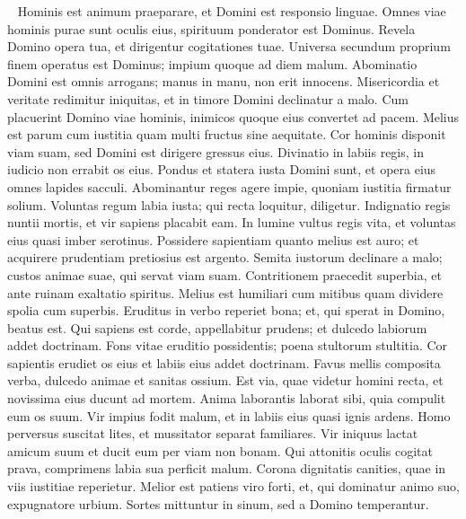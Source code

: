 \begin{biblechapter}   
\verse Hominis est animum praeparare, et Domini est responsio linguae. 
\verse Omnes viae hominis purae sunt oculis eius, spirituum ponderator est Dominus. 
\verse Revela Domino opera tua, et dirigentur cogitationes tuae. 
\verse Universa secundum proprium finem operatus est Dominus; impium quoque ad diem malum. 
\verse Abominatio Domini est omnis arrogans; manus in manu, non erit innocens. 
\verse Misericordia et veritate redimitur iniquitas, et in timore Domini declinatur a malo. 
\verse Cum placuerint Domino viae hominis, inimicos quoque eius convertet ad pacem. 
\verse Melius est parum cum iustitia quam multi fructus sine aequitate. 
\verse Cor hominis disponit viam suam, sed Domini est dirigere gressus eius. 
\verse Divinatio in labiis regis, in iudicio non errabit os eius. 
\verse Pondus et statera iusta Domini sunt, et opera eius omnes lapides sacculi. 
\verse Abominantur reges agere impie, quoniam iustitia firmatur solium. 
\verse Voluntas regum labia iusta; qui recta loquitur, diligetur. 
\verse Indignatio regis nuntii mortis, et vir sapiens placabit eam. 
\verse In lumine vultus regis vita, et voluntas eius quasi imber serotinus. 
\verse Possidere sapientiam quanto melius est auro; et acquirere prudentiam pretiosius est argento. 
\verse Semita iustorum declinare a malo; custos animae suae, qui servat viam suam. 
\verse Contritionem praecedit superbia, et ante ruinam exaltatio spiritus. 
\verse Melius est humiliari cum mitibus quam dividere spolia cum superbis. 
\verse Eruditus in verbo reperiet bona; et, qui sperat in Domino, beatus est. 
\verse Qui sapiens est corde, appellabitur prudens; et dulcedo labiorum addet doctrinam. 
\verse Fons vitae eruditio possidentis; poena stultorum stultitia. 
\verse Cor sapientis erudiet os eius et labiis eius addet doctrinam. 
\verse Favus mellis composita verba, dulcedo animae et sanitas ossium. 
\verse Est via, quae videtur homini recta, et novissima eius ducunt ad mortem. 
\verse Anima laborantis laborat sibi, quia compulit eum os suum. 
\verse Vir impius fodit malum, et in labiis eius quasi ignis ardens. 
\verse Homo perversus suscitat lites, et mussitator separat familiares. 
\verse Vir iniquus lactat amicum suum et ducit eum per viam non bonam. 
\verse Qui attonitis oculis cogitat prava, comprimens labia sua perficit malum. 
\verse Corona dignitatis canities, quae in viis iustitiae reperietur. 
\verse Melior est patiens viro forti, et, qui dominatur animo suo, expugnatore urbium. 
\verse Sortes mittuntur in sinum, sed a Domino temperantur. 
\end{biblechapter}

